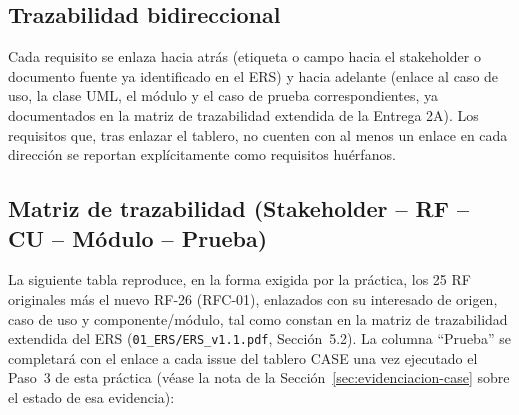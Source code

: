 \documentclass[11pt,a4paper]{article}
\begin{document}
\subsection{Trazabilidad bidireccional}
Cada requisito se enlaza hacia atrás (etiqueta o campo hacia el stakeholder o documento fuente ya identificado en el ERS) y hacia adelante (enlace al caso de uso, la clase UML, el módulo y el caso de prueba correspondientes, ya documentados en la matriz de trazabilidad extendida de la Entrega 2A). Los requisitos que, tras enlazar el tablero, no cuenten con al menos un enlace en cada dirección se reportan explícitamente como requisitos huérfanos.

\subsection{Matriz de trazabilidad (Stakeholder -- RF -- CU -- Módulo -- Prueba)}
La siguiente tabla reproduce, en la forma exigida por la práctica, los 25 RF originales más el nuevo RF-26 (RFC-01), enlazados con su interesado de origen, caso de uso y componente/módulo, tal como constan en la matriz de trazabilidad extendida del ERS (\texttt{01\_ERS/ERS\_v1.1.pdf}, Sección~5.2). La columna ``Prueba'' se completará con el enlace a cada issue del tablero CASE una vez ejecutado el Paso~3 de esta práctica (véase la nota de la Sección~\ref{sec:evidenciacion-case} sobre el estado de esa evidencia):
\end{document}
